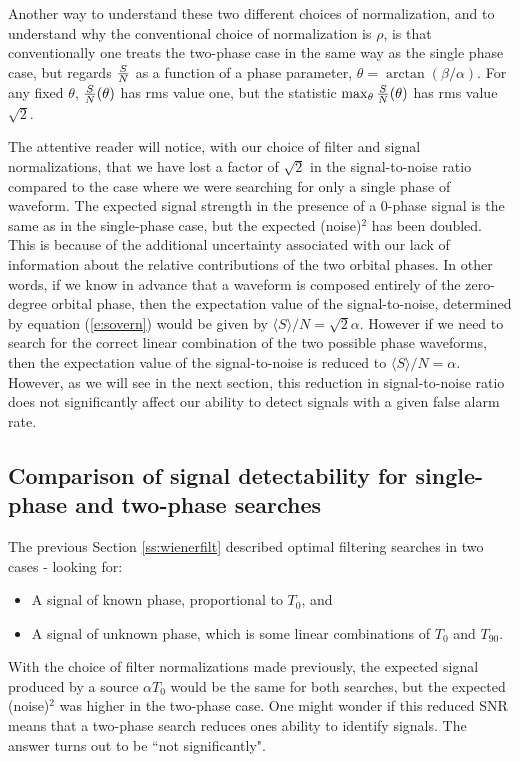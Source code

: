Another way to understand these two different choices of normalization,
and to understand why the conventional choice of normalization is $\rho$,
is that conventionally one treats the two-phase case in the same way
as the single phase case, but regards ${S \over N}$ as a function of a
phase parameter, $\theta = \arctan(\beta/\alpha)$.  For any fixed $\theta$,
${S \over N}(\theta)$ has rms value one, but the statistic $\max_\theta
{S \over N} (\theta)$ has rms value $\sqrt{2}$.

The attentive reader will notice, with our choice of filter and
signal normalizations, that we have lost a factor of $\sqrt{2}$ in the
signal-to-noise ratio compared to the case where we were searching for
only a single phase of waveform.  The expected signal strength in the
presence of a 0-phase signal is the same as in the single-phase case,
but the expected (noise)${}^2$ has been doubled.  This is because of the
additional uncertainty associated with our lack of information about the
relative contributions of the two orbital phases.  In other words, if we
know in advance that a waveform is composed entirely of the zero-degree
orbital phase, then the expectation value of the signal-to-noise,
determined by equation (\ref{e:sovern}) would be given by $\langle S
\rangle/N = \sqrt{2} \alpha$.  However if we need to search for the
correct linear combination of the two possible phase waveforms, then
the expectation value of the signal-to-noise is reduced to  $\langle
S \rangle/N = \alpha$.  However, as we will see in the next section,
this reduction in signal-to-noise ratio does not significantly affect
our ability to detect signals with a given false alarm rate.
\clearpage

\subsection{Comparison of signal detectability for single-phase and two-phase searches}
\label{ss:compare12}
The previous Section \ref{ss:wienerfilt} described optimal filtering searches in two cases -
looking for:
\begin{itemize}
\item 
A signal of known phase, proportional to $T_0$, and
\item
A signal of unknown phase, which is some linear
combinations of $T_0$ and $T_{90}$.
\end{itemize}
With the choice of filter normalizations made previously, the expected
signal produced by a source $\alpha T_0$ would be the same for both
searches, but the expected (noise)${}^2$ was higher in the two-phase case.
One might wonder if this reduced SNR means that a two-phase search reduces
ones ability to identify signals.  The answer turns out to be ``not significantly".

